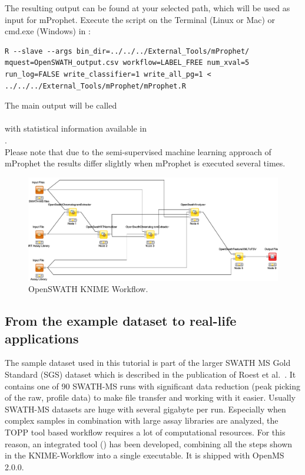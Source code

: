 The resulting output can be found at your selected path, which will be used as input for mProphet. Execute the script on the Terminal (Linux or Mac) or cmd.exe (Windows) in :

\begin{lstlisting}
R --slave --args bin_dir=../../../External_Tools/mProphet/ mquest=OpenSWATH_output.csv workflow=LABEL_FREE num_xval=5 run_log=FALSE write_classifier=1 write_all_pg=1 < ../../../External_Tools/mProphet/mProphet.R
\end{lstlisting}

The main output will be called\\
\\
with statistical information available in\\
.\\

Please note that due to the semi-supervised machine learning approach of mProphet the results differ slightly when mProphet is executed several times.

\begin{figure}[htbp]
  \includegraphics[width=1\textwidth]{graphics/OpenSwath}
\caption{OpenSWATH KNIME Workflow.}
\label{fig:toppas}
\end{figure}

\subsection{From the example dataset to real-life applications}
The sample dataset used in this tutorial is part of the larger SWATH MS Gold Standard (SGS) dataset which is described in the publication of Roest et al.~\cite{Rost2014fd}.
It contains one of 90 SWATH-MS runs with significant data reduction (peak picking of the raw, profile data) to make file transfer and working with it easier. Usually SWATH-MS datasets are huge with several gigabyte per run. Especially when complex samples in combination with large assay libraries are analyzed, the TOPP tool based workflow requires a lot of computational resources. For this reason, an integrated tool () has been developed, combining all the steps shown in the KNIME-Workflow into a single executable. It is shipped with OpenMS 2.0.0.

